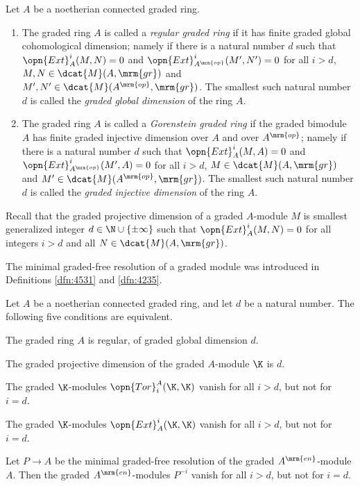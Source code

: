 \begin{dfn} \label{dfn:3920} 
Let $A$ be a noetherian connected graded ring. 
\begin{enumerate}
\item The graded ring $A$ is called a {\em regular graded ring}
if it has finite graded global cohomological dimension; namely if there is a 
natural number $d$ such that 
$\opn{Ext}^i_A(M, N) = 0$ and
$\opn{Ext}^i_{A^{\mrm{op}}}(M', N') = 0$ 
for all $i > d$,  $M, N \in \dcat{M}(A, \mrm{gr})$ and 
$M', N' \in \dcat{M}(A^{\mrm{op}}, \mrm{gr})$.
The smallest such natural number $d$ is called the 
{\em graded global dimension}
of the ring $A$.

\item The graded ring $A$ is called a {\em Gorenstein graded ring}
if the graded bimodule $A$ has finite graded injective dimension 
over $A$ and over $A^{\mrm{op}}$; namely if there is a natural number $d$ 
such that $\opn{Ext}^i_A(M, A) = 0$ and
$\opn{Ext}^i_{A^{\mrm{op}}}(M', A) = 0$ 
for all $i > d$, $M \in \dcat{M}(A, \mrm{gr})$ and 
$M' \in \dcat{M}(A^{\mrm{op}}, \mrm{gr})$.
The smallest such natural number $d$ is called the 
{\em graded injective dimension} 
of the ring $A$.
\end{enumerate}
\end{dfn}

Recall that the graded projective dimension of a graded $A$-module $M$ is 
smallest generalized integer $d \in \N \cup \{ \pm \infty \}$ 
such that $\opn{Ext}^i_A(M, N) = 0$ 
for all integers $i > d$ and all $N \in \dcat{M}(A, \mrm{gr})$.

The minimal graded-free resolution of a graded module was introduced in 
Definitions  \ref{dfn:4531} and \ref{dfn:4235}. 
 
\begin{thm} \label{thm:4548} 
Let $A$ be a noetherian connected graded ring, and let $d$ be a natural 
number. The following five conditions are equivalent. 
\begin{itemize}
 The graded ring $A$ is regular, of graded global dimension $d$. 

 The graded projective dimension of the graded $A$-module $\K$ is 
$d$. 

 The graded $\K$-modules 
$\opn{Tor}_i^A(\K, \K)$ vanish for all $i > d$, but not for $i = d$. 

 The graded $\K$-modules 
$\opn{Ext}^i_A(\K, \K)$ vanish for all $i > d$, but not for $i = d$. 

 Let $P \to A$ be the minimal graded-free resolution of the graded
$A^{\mrm{en}}$-module $A$. Then the graded $A^{\mrm{en}}$-modules $P^{-i}$  
vanish for all $i > d$, but not for $i = d$.  
\end{itemize}
\end{thm}

